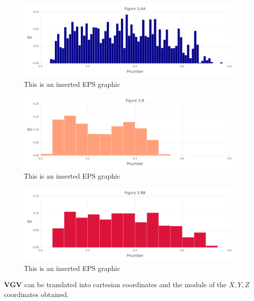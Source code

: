 \documentclass[10pt,letterpaper]{article}
\begin{document}
\begin{figure}[ht]
\begin{center}
\includegraphics[scale=0.5]{1m14/3aafigure.pdf}
\caption{This is an inserted EPS graphic}
\label{fig8}
\end{center}
\end{figure}

\begin{figure}[ht]
\begin{center}
\includegraphics[scale=0.5]{1m14/3bfigure.pdf}
\caption{This is an inserted EPS graphic}
\label{fig10}
\end{center}
\end{figure}

\begin{figure}[ht]
\begin{center}
\includegraphics[scale=0.5]{1m14/3bbfigure.pdf}
\caption{This is an inserted EPS graphic}
\label{fig11}
\end{center}
\end{figure}

\FloatBarrier


\textbf{VGV} can be translated into cartesian coordinates and the module of the \(X, Y, Z\) coordinates obtained.
\end{document}
